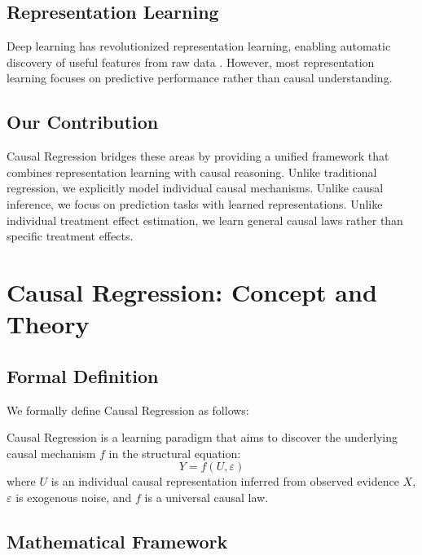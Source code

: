 \documentclass[conference]{IEEEtran}
\begin{document}
\subsection{Representation Learning}
Deep learning has revolutionized representation learning, enabling automatic discovery of useful features from raw data \cite{bengio2013representation}. However, most representation learning focuses on predictive performance rather than causal understanding.

\subsection{Our Contribution}
Causal Regression bridges these areas by providing a unified framework that combines representation learning with causal reasoning. Unlike traditional regression, we explicitly model individual causal mechanisms. Unlike causal inference, we focus on prediction tasks with learned representations. Unlike individual treatment effect estimation, we learn general causal laws rather than specific treatment effects.

\section{Causal Regression: Concept and Theory}
\label{sec:concept}

\subsection{Formal Definition}

We formally define Causal Regression as follows:

\begin{definition}
Causal Regression is a learning paradigm that aims to discover the underlying causal mechanism $f$ in the structural equation:
\begin{equation}
Y = f(U, \varepsilon)
\end{equation}
where $U$ is an individual causal representation inferred from observed evidence $X$, $\varepsilon$ is exogenous noise, and $f$ is a universal causal law.
\end{definition}

\subsection{Mathematical Framework}
\end{document}
